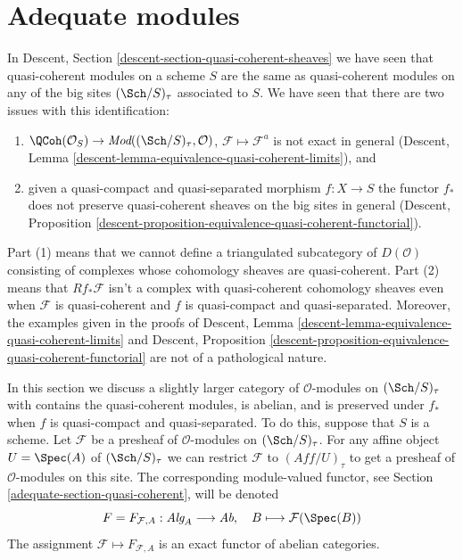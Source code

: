 \section{Adequate modules}
\label{adequate-section-adequate}
In
Descent, Section \ref{descent-section-quasi-coherent-sheaves}
we have seen that quasi-coherent modules on a scheme $S$
are the same as quasi-coherent modules on any of the big
sites $(\Sch/S)_\tau$ associated to $S$. We have seen that there
are two issues with this identification:
\begin{enumerate}
\item $\QCoh(\mathcal{O}_S) \to
\textit{Mod}((\Sch/S)_\tau, \mathcal{O})$,
$\mathcal{F} \mapsto \mathcal{F}^a$ is not exact in general
(Descent, Lemma \ref{descent-lemma-equivalence-quasi-coherent-limits}), and
\item given a quasi-compact and quasi-separated morphism $f : X \to S$
the functor $f_*$ does not preserve quasi-coherent sheaves on the
big sites in general (Descent, Proposition
\ref{descent-proposition-equivalence-quasi-coherent-functorial}).
\end{enumerate}
Part (1) means that we cannot define a triangulated subcategory
of $D(\mathcal{O})$ consisting of complexes whose cohomology sheaves
are quasi-coherent. Part (2) means that $Rf_*\mathcal{F}$ isn't a
complex with quasi-coherent cohomology sheaves even when $\mathcal{F}$
is quasi-coherent and $f$ is quasi-compact and quasi-separated.
Moreover, the examples given in the proofs of
Descent, Lemma
\ref{descent-lemma-equivalence-quasi-coherent-limits}
and
Descent, Proposition
\ref{descent-proposition-equivalence-quasi-coherent-functorial}
are not of a pathological nature.

\medskip\noindent
In this section we discuss a slightly larger category
of $\mathcal{O}$-modules on $(\Sch/S)_\tau$ with contains the
quasi-coherent modules, is abelian, and is preserved under $f_*$ when
$f$ is quasi-compact and quasi-separated.
To do this, suppose that $S$ is a scheme. Let $\mathcal{F}$ be a presheaf
of $\mathcal{O}$-modules on $(\Sch/S)_\tau$.
For any affine object $U = \Spec(A)$ of $(\Sch/S)_\tau$
we can restrict $\mathcal{F}$ to $(\textit{Aff}/U)_\tau$ to get
a presheaf of $\mathcal{O}$-modules on this site. The corresponding
module-valued functor, see
Section \ref{adequate-section-quasi-coherent},
will be denoted
$$
F = F_{\mathcal{F}, A} :
\textit{Alg}_A \longrightarrow \textit{Ab},
\quad
B \longmapsto \mathcal{F}(\Spec(B))
$$
The assignment $\mathcal{F} \mapsto F_{\mathcal{F}, A}$ is an exact
functor of abelian categories.

